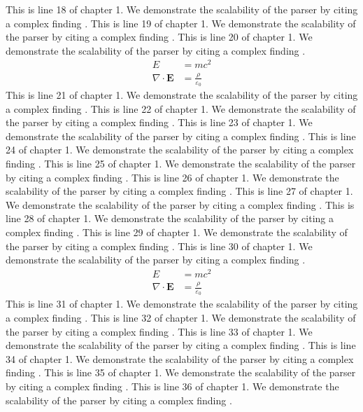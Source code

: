 This is line 18 of chapter 1. We demonstrate the scalability of the parser by citing a complex finding \cite{ref1_18}.
This is line 19 of chapter 1. We demonstrate the scalability of the parser by citing a complex finding \cite{ref1_19}.
This is line 20 of chapter 1. We demonstrate the scalability of the parser by citing a complex finding \cite{ref1_20}.
\begin{align*}
  E &= mc^2 \\
  \nabla \cdot \mathbf{E} &= \frac{\rho}{\varepsilon_0}
\end{align*}
This is line 21 of chapter 1. We demonstrate the scalability of the parser by citing a complex finding \cite{ref1_21}.
This is line 22 of chapter 1. We demonstrate the scalability of the parser by citing a complex finding \cite{ref1_22}.
This is line 23 of chapter 1. We demonstrate the scalability of the parser by citing a complex finding \cite{ref1_23}.
This is line 24 of chapter 1. We demonstrate the scalability of the parser by citing a complex finding \cite{ref1_24}.
This is line 25 of chapter 1. We demonstrate the scalability of the parser by citing a complex finding \cite{ref1_25}.
This is line 26 of chapter 1. We demonstrate the scalability of the parser by citing a complex finding \cite{ref1_26}.
This is line 27 of chapter 1. We demonstrate the scalability of the parser by citing a complex finding \cite{ref1_27}.
This is line 28 of chapter 1. We demonstrate the scalability of the parser by citing a complex finding \cite{ref1_28}.
This is line 29 of chapter 1. We demonstrate the scalability of the parser by citing a complex finding \cite{ref1_29}.
This is line 30 of chapter 1. We demonstrate the scalability of the parser by citing a complex finding \cite{ref1_30}.
\begin{align*}
  E &= mc^2 \\
  \nabla \cdot \mathbf{E} &= \frac{\rho}{\varepsilon_0}
\end{align*}
This is line 31 of chapter 1. We demonstrate the scalability of the parser by citing a complex finding \cite{ref1_31}.
This is line 32 of chapter 1. We demonstrate the scalability of the parser by citing a complex finding \cite{ref1_32}.
This is line 33 of chapter 1. We demonstrate the scalability of the parser by citing a complex finding \cite{ref1_33}.
This is line 34 of chapter 1. We demonstrate the scalability of the parser by citing a complex finding \cite{ref1_34}.
This is line 35 of chapter 1. We demonstrate the scalability of the parser by citing a complex finding \cite{ref1_35}.
This is line 36 of chapter 1. We demonstrate the scalability of the parser by citing a complex finding \cite{ref1_36}.
